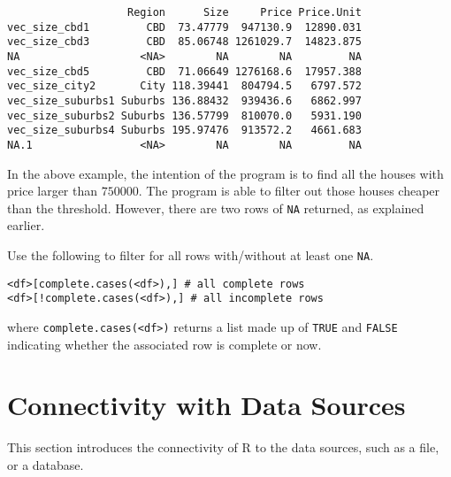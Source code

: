 \begin{lstlisting}
                   Region      Size     Price Price.Unit
vec_size_cbd1         CBD  73.47779  947130.9  12890.031
vec_size_cbd3         CBD  85.06748 1261029.7  14823.875
NA                   <NA>        NA        NA         NA
vec_size_cbd5         CBD  71.06649 1276168.6  17957.388
vec_size_city2       City 118.39441  804794.5   6797.572
vec_size_suburbs1 Suburbs 136.88432  939436.6   6862.997
vec_size_suburbs2 Suburbs 136.57799  810070.0   5931.190
vec_size_suburbs4 Suburbs 195.97476  913572.2   4661.683
NA.1                 <NA>        NA        NA         NA
\end{lstlisting}
In the above example, the intention of the program is to find all the houses with price larger than $750000$. The program is able to filter out those houses cheaper than the threshold. However, there are two rows of \verb|NA| returned, as explained earlier.

Use the following to filter for all rows with/without at least one \verb|NA|.
\begin{lstlisting}
<df>[complete.cases(<df>),] # all complete rows
<df>[!complete.cases(<df>),] # all incomplete rows
\end{lstlisting}
where \verb|complete.cases(<df>)| returns a list made up of \verb|TRUE| and \verb|FALSE| indicating whether the associated row is complete or now.





\section{Connectivity with Data Sources} \label{ch:r2:sec:datasource}

This section introduces the connectivity of R to the data sources, such as a file, or a database.







